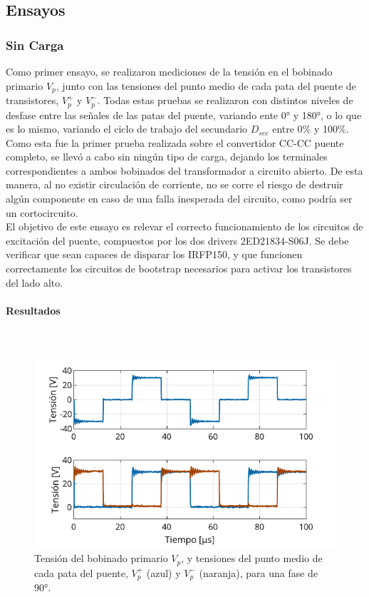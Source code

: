 \subsection{Ensayos}

\subsubsection{Sin Carga}

Como primer ensayo, se realizaron mediciones de la tensión en el bobinado primario $V_p$, junto con las tensiones del punto medio de cada pata del puente de transistores, $V_p^+$ y $V_p^-$. Todas estas pruebas se realizaron con distintos niveles de desfase entre las señales de las patas del puente, variando ente 0° y 180°, o lo que es lo mismo, variando el ciclo de trabajo del secundario $D_{sec}$ entre 0\% y 100\%.\\

Como esta fue la primer prueba realizada sobre el convertidor CC-CC puente completo, se llevó a cabo sin ningún tipo de carga, dejando los terminales correspondientes a ambos bobinados del transformador a circuito abierto. De esta manera, al no existir circulación de corriente, no se corre el riesgo de destruir algún componente en caso de una falla inesperada del circuito, como podría ser un cortocircuito.\\

El objetivo de este ensayo es relevar el correcto funcionamiento de los circuitos de excitación del puente, compuestos por los dos drivers 2ED21834-S06J. Se debe verificar que sean capaces de disparar los IRFP150, y que funcionen correctamente los circuitos de bootstrap necesarios para activar los transistores del lado alto.\\

\paragraph{Resultados}

\lipsum[1]\\

\begin{figure}[h]
    \centering
    \includegraphics[scale=1.1]{Imagenes/Grafico 90DEG.pdf}
    \caption{Tensión del bobinado primario $V_p$, y tensiones del punto medio de cada pata del puente, $V_p^+$ (azul) y $V_p^-$ (naranja), para una fase de 90°.}
    \label{90DEG}
\end{figure}

